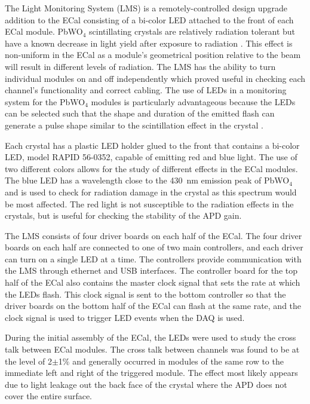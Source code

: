 The Light Monitoring System (LMS) is a remotely-controlled design upgrade addition to the ECal consisting of a bi-color LED attached to the front of each ECal module. PbWO$_4$ scintillating crystals are relatively radiation tolerant but have a known decrease in light yield after exposure to radiation \cite{Batarin}. This effect is non-uniform in the ECal as a module's geometrical position relative to the beam will result in different levels of radiation. The LMS has the ability to turn individual modules on and off independently which proved useful in checking each channel's functionality and correct cabling. The use of LEDs in a monitoring system for the PbWO$_4$ modules is particularly advantageous because the LEDs can be selected such that the shape and duration of the emitted flash can generate a pulse shape similar to the scintillation effect in the crystal \cite{Battaglieri}.

Each crystal has a plastic LED holder glued to the front that contains a bi-color LED, model RAPID 56-0352, capable of emitting red and blue light. The use of two different colors allows for the study of different effects in the ECal modules. The blue LED has a wavelength close to the 430~nm emission peak of PbWO$_4$  \cite{Battaglieri} and is used to check for radiation damage in the crystal as this spectrum would be most affected. The red light is not susceptible to the radiation effects in the crystals, but is useful for checking the stability of the  APD gain. 

The LMS consists of four driver boards on each half of the ECal. The four driver boards on each half are connected to one of two main controllers, and each driver can turn on a single LED at a time. The controllers provide communication with the LMS through ethernet and USB interfaces. The controller board for the top half of the ECal also contains the master clock signal that sets the rate at which the LEDs flash. This clock signal is sent to the bottom controller so that the driver boards on the bottom half of the ECal can flash at the same rate, and the clock signal is used to trigger LED events when the DAQ is used. 


During the initial assembly of the ECal, the LEDs were used to study the cross talk between ECal modules. The cross talk between channels was found to be at the level of 2$\pm$1$\%$ and generally occurred in modules of the same row to the immediate left and right of the triggered module. The effect most likely appears due to light leakage out the back face of the crystal where the APD does not cover the entire surface.

